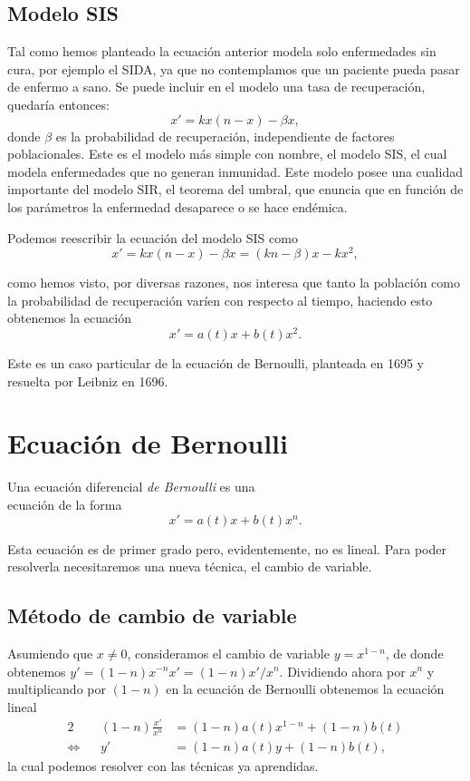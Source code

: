 \documentclass[../ecuaciones_diferenciales.tex]{subfiles}
\begin{document}
\subsection{Modelo SIS}

Tal como hemos planteado la ecuación anterior modela solo enfermedades sin cura, por
ejemplo el SIDA, ya que no contemplamos que un paciente pueda pasar de enfermo a
sano. Se puede incluir en el modelo una tasa de recuperación, quedaría entonces:
\[x' = k x(n - x) - \beta x,\]
donde \(\beta\) es la probabilidad de recuperación, independiente de factores
poblacionales. Este es el modelo más simple con nombre, el modelo SIS, el cual
modela enfermedades que no generan inmunidad. Este modelo posee una cualidad
importante del modelo SIR, el teorema del umbral, que enuncia que en función de
los parámetros la enfermedad desaparece o se hace endémica.

Podemos reescribir la ecuación del modelo SIS como
\[x' = k x(n - x) - \beta x = (kn - \beta)x - kx^2,\]

como hemos visto, por diversas razones, nos interesa que tanto la población como
la probabilidad de recuperación varíen con respecto al tiempo, haciendo esto
obtenemos la ecuación
\[x' = a(t)x + b(t)x^2.\]

Este es un caso particular de la ecuación de Bernoulli, planteada en 1695 y
resuelta por Leibniz en 1696.

\section{Ecuación de Bernoulli}

\begin{definition}
	Una ecuación diferencial \emph{de Bernoulli} es una \\ %
	ecuación de la forma
	\[x' = a(t)x + b(t)x^n.\]
\end{definition}

Esta ecuación es de primer grado pero, evidentemente, no es lineal. Para poder
resolverla necesitaremos una nueva técnica, el cambio de variable.

\subsection{Método de cambio de variable}

Asumiendo que \(x \neq 0\), consideramos el cambio de variable
\(y = x^{1 - n}\), de donde obtenemos
\(y' = (1 - n) x^{-n} x' = (1 - n)x'/x^n\). Dividiendo ahora por \(x^n\) y
multiplicando por \((1 - n)\) en la ecuación de Bernoulli obtenemos la ecuación
lineal
\begin{alignat*}{2}
	     &  & (1 - n)\frac{x'}{x^n} & = (1-n)a(t)x^{1-n} + (1-n)b(t) \\
	\iff &  & y'                    & = (1 - n)a(t)y + (1 - n)b(t),
\end{alignat*}
la cual podemos resolver con las técnicas ya aprendidas.
\end{document}
